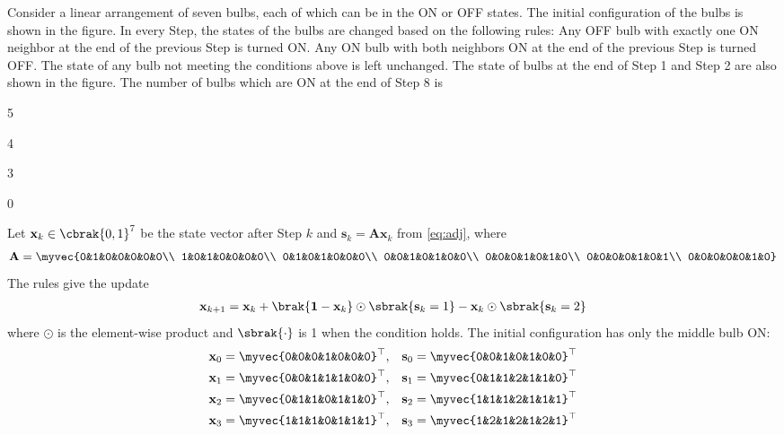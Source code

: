 \begin{enumerate}[label=1.2.\arabic*,leftmargin=*,labelsep=0.8em,itemsep=2ex]
\problem Consider a linear arrangement of seven bulbs, each of which can be in the ON or OFF states. The initial configuration of the bulbs is shown in the figure. In every Step, the states of the bulbs are changed based on the following rules:
Any OFF bulb with exactly one ON neighbor at the end of the previous Step is turned ON. Any ON bulb with both neighbors ON at the end of the previous Step is turned OFF. The state of any bulb not meeting the conditions above is left unchanged.
The state of bulbs at the end of Step 1 and Step 2 are also shown in the figure. The number of bulbs which are ON at the end of Step 8 is \underline{\hspace{2cm}} \gate
\begin{options}
\item 5
\item 4
\item 3
\item 0
\end{options}
\solution Let $\mathbf{x}_k\in\cbrak{0,1}^7$ be the state vector after Step $k$ and $\mathbf{s}_k = \mathbf{A}\mathbf{x}_k$ from \eqref{eq:adj}, where
\begin{align}
\mathbf{A} = \myvec{0&1&0&0&0&0&0\\ 1&0&1&0&0&0&0\\ 0&1&0&1&0&0&0\\ 0&0&1&0&1&0&0\\ 0&0&0&1&0&1&0\\ 0&0&0&0&1&0&1\\ 0&0&0&0&0&1&0}
\end{align}
The rules give the update
\begin{align}
\mathbf{x}_{k+1} = \mathbf{x}_k + \brak{\mathbf{1} - \mathbf{x}_k}\odot\sbrak{\mathbf{s}_k = 1} - \mathbf{x}_k\odot\sbrak{\mathbf{s}_k = 2}
\label{eq:bulbupdate}
\end{align}
where $\odot$ is the element-wise product and $\sbrak{\cdot}$ is 1 when the condition holds. The initial configuration has only the middle bulb ON:
\begin{align}
\mathbf{x}_0 &= \myvec{0&0&0&1&0&0&0}^\top, & \mathbf{s}_0 &= \myvec{0&0&1&0&1&0&0}^\top\\
\mathbf{x}_1 &= \myvec{0&0&1&1&1&0&0}^\top, & \mathbf{s}_1 &= \myvec{0&1&1&2&1&1&0}^\top\\
\mathbf{x}_2 &= \myvec{0&1&1&0&1&1&0}^\top, & \mathbf{s}_2 &= \myvec{1&1&1&2&1&1&1}^\top\\
\mathbf{x}_3 &= \myvec{1&1&1&0&1&1&1}^\top, & \mathbf{s}_3 &= \myvec{1&2&1&2&1&2&1}^\top\\

\end{align}
\end{enumerate}
